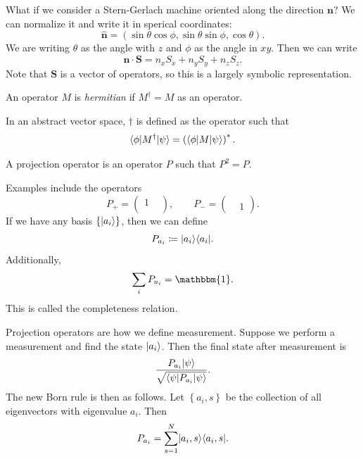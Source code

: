 What if we consider a Stern-Gerlach machine oriented along the direction $\mathbf{n} $? We can normalize it and write it in sperical coordinates:
\[
	\mathbf{\hat{n} } =(\sin \theta \cos \phi ,\sin \theta \sin \phi ,\cos \theta )
.\]
We are writing $\theta $ as the angle with $z$ and $\phi $ as the angle in $xy$. Then we can write
\[
	\mathbf{\hat{n} } \cdot \mathbf{S} = n_xS_x+n_yS_y+n_zS_z
.\]
Note that $\mathbf{S} $ is a vector of operators, so this is a largely symbolic representation.
\begin{definition}\label{dfn:1.3}
	An operator $M$ is \emph{hermitian} if $M^{\dagger} =M$ as an operator.
\end{definition}
In an abstract vector space, ${\dagger} $ is defined as the operator such that
\[
	\langle\phi \rvert M^{\dagger} \lvert\psi \rangle =\left( \langle\phi \rvert M \lvert\psi \rangle  \right)^*
.\]
\begin{definition}\label{dfn:1.4}
	A projection operator is an operator $P$ such that $P^2=P$.
\end{definition}
Examples include the operators
\[
	P_+=\begin{pmatrix}
	1 &  \\
	 & 
	\end{pmatrix},\qquad P_-=\begin{pmatrix}
	 &  \\
	 & 1
	\end{pmatrix}
.\]
If we have any basis $\left\{ \lvert a_i\rangle  \right\} $, then we can define
\[
	P_{a_i} \coloneqq \lvert a_i\rangle \langle a_i\rvert 
.\]
Additionally,
\[
	\sum_{i} P_{a_i} =\mathbbm{1} 
.\]
This is called the completeness relation.

Projection operators are how we define measurement. Suppose we perform a measurement and find the state $\lvert a_i\rangle $. Then the final state after measurement is
\[
	\frac{P_{a_i} \lvert\psi \rangle }{\sqrt{\langle\psi \rvert P_{a_i} \lvert\psi \rangle } } 
.\]
The new Born rule is then as follows. Let $\left\{ a_i,s \right\} $ be the collection of all eigenvectors with eigenvalue $a_i$. Then
\[
	P_{a_i } =\sum_{s=1}^{N} \lvert a_i,s\rangle \langle a_i,s\rvert 
.\]

